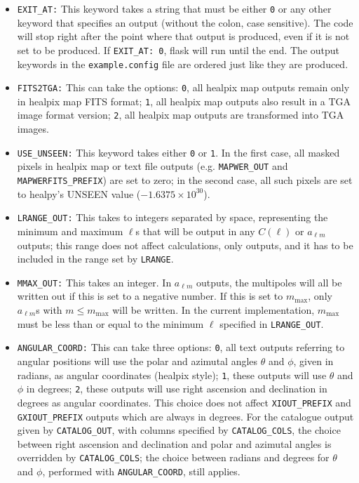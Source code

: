 \documentclass[12pt]{book} %
\newcommand{\nv}[1]{\mathrm{#1}}                 %
\begin{document}
\begin{itemize}
\item {\tt EXIT\_AT:} This keyword takes a string that must be either {\tt 0} or any other keyword
  that specifies an output (without the colon, case sensitive). The code will stop right after 
  the point where that output is produced, even if it is not set to be produced. If {\tt EXIT\_AT: 0}, 
  {\sc flask} will run until the end. The output keywords in the {\tt example.config} file 
  are ordered just like they are produced.

\item {\tt FITS2TGA:} This can take the options: {\tt 0}, all {\sc healpix} map outputs remain only 
  in {\sc healpix} map FITS format; {\tt 1}, all {\sc healpix} map outputs also result in a TGA
  image format version; {\tt 2}, all {\sc healpix} map outputs are transformed into TGA images.

\item {\tt USE\_UNSEEN:} This keyword takes either {\tt 0} or {\tt1}. In the first case, all masked 
  pixels in {\sc healpix} map or text file outputs (e.g. {\tt MAPWER\_OUT} and 
  {\tt MAPWERFITS\_PREFIX}) are set to zero; in the second case, all such pixels are 
  set to {\sc healpy}'s UNSEEN value ($-1.6375\times10^{30}$).

\item {\tt LRANGE\_OUT:} This takes to integers separated by space, representing the minimum and 
  maximum $\ell$s that will be output in any $C(\ell)$ or $a_{\ell m}$ outputs; this range does 
  not affect calculations, only outputs, and it has to be included in the range set by {\tt LRANGE}.
  
\item {\tt MMAX\_OUT:} This takes an integer. In $a_{\ell m}$ outputs, the multipoles will all 
  be written out if this is set to a negative number. If this is set to $m_{\nv{max}}$, only $a_{\ell m}$s 
  with $m\leq m_{\nv{max}}$ will be written. In the current implementation, $m_{\nv{max}}$ must be less than 
  or equal to the minimum $\ell$ specified in {\tt LRANGE\_OUT}.

\item {\tt ANGULAR\_COORD:} This can take three options: {\tt 0}, all text outputs referring 
  to angular positions will use the polar and azimutal angles $\theta$ and $\phi$, given in radians, 
  as angular coordinates ({\sc healpix} style); {\tt 1}, these outputs will use $\theta$ and $\phi$ 
  in degrees; {\tt 2}, these outputs will use right ascension and declination in degrees as 
  angular coordinates. This choice does not affect {\tt XIOUT\_PREFIX} and {\tt GXIOUT\_PREFIX} 
  outputs which are always in degrees. For the catalogue output given by {\tt CATALOG\_OUT}, 
  with columns specified by {\tt CATALOG\_COLS}, the choice between right ascension and declination and 
  polar and azimutal angles is overridden by {\tt CATALOG\_COLS}; the choice between radians and degrees 
  for $\theta$ and $\phi$, performed with {\tt ANGULAR\_COORD}, still applies.


\end{itemize}
\end{document}
